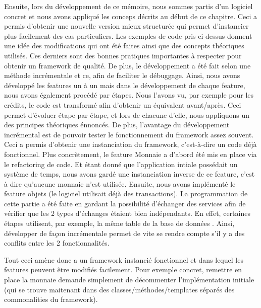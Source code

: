 {\begin{description}
Ensuite,  lors du développement de ce mémoire,  nous sommes partis d'un logiciel concret et nous avons appliqué les conceps décrits au début de ce chapitre.  Ceci a permis d'obtenir une nouvelle version mieux structurée qui permet d'instancier plus facilement des cas particuliers.  Les exemples de code pris ci-dessus donnent une idée des modifications qui ont été faites ainsi que des concepts théoriques utilisés.  Ces derniers sont des bonnes pratiques importantes à respecter pour obtenir un framework de qualité.  De plus,  le développement a été fait selon une méthode incrémentale et ce,  afin de faciliter le débuggage.  Ainsi,  nous avons développé les features un à un mais dans le développement de chaque feature,  nous avons également procédé par étapes.  Nous l'avons vu,  par exemple pour les crédits,  le code est transformé afin d'obtenir un équivalent avant/après.  Ceci permet d'évoluer étape par étape,  et lors de chacune d'elle,  nous appliquons un des principes théoriques énnoncés.  De plus,  l'avantage du développement incrémental est de pouvoir tester le fonctionnement du framework assez souvent.  Ceci a permis d'obtenir une instanciation du framework,  c'est-à-dire un code déjà fonctionnel.  Plus concrètement,  le feature Monnaie a d'abord été mis en place via le refactoring de code.  Et étant donné que l'application intiale possédait un système de temps,  nous avons gardé une instanciation inverse de ce feature,  c'est à dire qu'aucune monnaie n'est utilisée.  Ensuite,  nous avons implémenté le feature objets (le logiciel utilisait déjà des transactions).  La programmation de cette partie a été faite en gardant la possibilité d'échanger des services afin de vérifier que les 2 types d'échanges étaient bien indépendants.  En effet,  certaines étapes utilisent,  par exemple,  la même table de la base de données .  Ainsi,  développer de façon incrémentale permet de vite se rendre compte s'il y a des conflits entre les 2 fonctionnalités.  

Tout ceci amène donc a un framework instancié fonctionnel et dans lequel les features peuvent être modifiés facilement.  Pour exemple concret,  remettre en place la monnaie demande simplement de décommenter l'implémentation initiale (qui se trouve maitenant dans des classes/méthodes/templates séparés des commonalities du framework).  


\end{description}}
